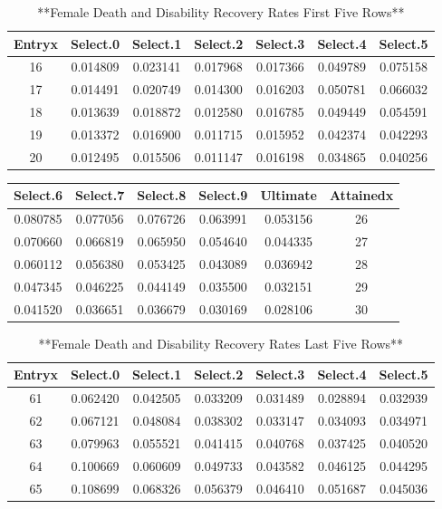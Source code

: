 \documentclass[
]{book}
\begin{document}
\begin{table}

\caption{\label{tab:unnamed-chunk-41}**Female Death and Disability Recovery Rates First Five Rows**}
\centering
\begin{tabular}[t]{c|c|c|c|c|c|c}
\hline
Entryx & Select.0 & Select.1 & Select.2 & Select.3 & Select.4 & Select.5\\
\hline
16 & 0.014809 & 0.023141 & 0.017968 & 0.017366 & 0.049789 & 0.075158\\
\hline
17 & 0.014491 & 0.020749 & 0.014300 & 0.016203 & 0.050781 & 0.066032\\
\hline
18 & 0.013639 & 0.018872 & 0.012580 & 0.016785 & 0.049449 & 0.054591\\
\hline
19 & 0.013372 & 0.016900 & 0.011715 & 0.015952 & 0.042374 & 0.042293\\
\hline
20 & 0.012495 & 0.015506 & 0.011147 & 0.016198 & 0.034865 & 0.040256\\
\hline
\end{tabular}
\end{table}

\begin{tabular}{c|c|c|c|c|c}
\hline
Select.6 & Select.7 & Select.8 & Select.9 & Ultimate & Attainedx\\
\hline
0.080785 & 0.077056 & 0.076726 & 0.063991 & 0.053156 & 26\\
\hline
0.070660 & 0.066819 & 0.065950 & 0.054640 & 0.044335 & 27\\
\hline
0.060112 & 0.056380 & 0.053425 & 0.043089 & 0.036942 & 28\\
\hline
0.047345 & 0.046225 & 0.044149 & 0.035500 & 0.032151 & 29\\
\hline
0.041520 & 0.036651 & 0.036679 & 0.030169 & 0.028106 & 30\\
\hline
\end{tabular}

\begin{table}

\caption{\label{tab:unnamed-chunk-41}**Female Death and Disability Recovery Rates Last Five Rows**}
\centering
\begin{tabular}[t]{c|c|c|c|c|c|c}
\hline
Entryx & Select.0 & Select.1 & Select.2 & Select.3 & Select.4 & Select.5\\
\hline
61 & 0.062420 & 0.042505 & 0.033209 & 0.031489 & 0.028894 & 0.032939\\
\hline
62 & 0.067121 & 0.048084 & 0.038302 & 0.033147 & 0.034093 & 0.034971\\
\hline
63 & 0.079963 & 0.055521 & 0.041415 & 0.040768 & 0.037425 & 0.040520\\
\hline
64 & 0.100669 & 0.060609 & 0.049733 & 0.043582 & 0.046125 & 0.044295\\
\hline
65 & 0.108699 & 0.068326 & 0.056379 & 0.046410 & 0.051687 & 0.045036\\
\hline
\end{tabular}
\end{table}
\end{document}
